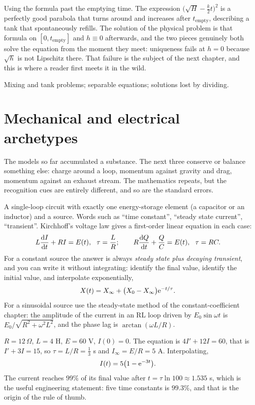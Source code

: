 \begin{trap}
Using the formula past the emptying time. The expression $\bigl(\sqrt H-\tfrac k2t\bigr)^{2}$ is a perfectly good parabola that turns around and increases after $t_{\text{empty}}$, describing a tank that spontaneously refills. The solution of the physical problem is that formula on $[0,t_{\text{empty}}]$ and $h\equiv0$ afterwards, and the two pieces genuinely both solve the equation from the moment they meet: uniqueness fails at $h=0$ because $\sqrt h$ is not Lipschitz there. That failure is the subject of the next chapter, and this is where a reader first meets it in the wild.
\end{trap}

\begin{seealsob}Mixing and tank problems; separable equations; solutions lost by dividing.\end{seealsob}

\section{Mechanical and electrical archetypes}

The models so far accumulated a substance. The next three conserve or balance something else: charge around a loop, momentum against gravity and drag, momentum against an exhaust stream. The mathematics repeats, but the recognition cues are entirely different, and so are the standard errors.

\cue A single-loop circuit with exactly one energy-storage element (a capacitor or an inductor) and a source. Words such as ``time constant'', ``steady state current'', ``transient''.
\method Kirchhoff's voltage law gives a first-order linear equation in each case:
\[L\frac{\mathrm{d}I}{\mathrm{d}t}+RI=E(t),\ \ \tau=\frac LR;\qquad R\frac{\mathrm{d}Q}{\mathrm{d}t}+\frac QC=E(t),\ \ \tau=RC.\]
For a constant source the answer is always \emph{steady state plus decaying transient}, and you can write it without integrating: identify the final value, identify the initial value, and interpolate exponentially,
\[X(t)=X_\infty+\bigl(X_0-X_\infty\bigr)\mathrm{e}^{-t/\tau}.\]
For a sinusoidal source use the steady-state method of the constant-coefficient chapter: the amplitude of the current in an RL loop driven by $E_0\sin\omega t$ is $E_0/\sqrt{R^{2}+\omega^{2}L^{2}}$, and the phase lag is $\arctan(\omega L/R)$.

\begin{worked}
$R=12\,\Omega$, $L=4$ H, $E=60$ V, $I(0)=0$. The equation is $4I'+12I=60$, that is $I'+3I=15$, so $\tau=L/R=\tfrac13$ s and $I_\infty=E/R=5$ A. Interpolating,
\[I(t)=5\bigl(1-\mathrm{e}^{-3t}\bigr).\]
The current reaches $99\%$ of its final value after $t=\tau\ln100\approx1.535$ s, which is the useful engineering statement: five time constants is $99.3\%$, and that is the origin of the rule of thumb.
\end{worked}

